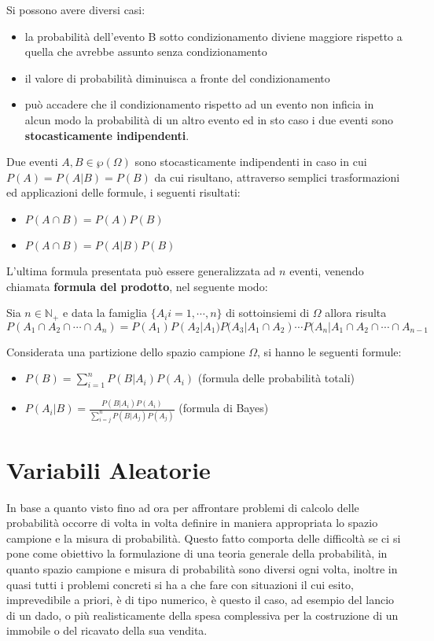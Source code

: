 \documentclass[a4paper,12pt, oneside]{book}
\newcommand{\numberset}{\mathbb}
\newcommand{\N}{\numberset{N}}
\begin{document}
Si possono avere diversi casi:
\begin{itemize}
    \item la probabilità dell’evento B sotto condizionamento diviene maggiore rispetto a quella 
          che avrebbe assunto senza condizionamento
    \item il valore di probabilità diminuisca a fronte del condizionamento
    \item può accadere che il condizionamento rispetto ad un evento non inficia in alcun modo la probabilità di 
        un altro evento ed in sto caso i due eventi sono \textbf{stocasticamente indipendenti}.
\end{itemize}
Due eventi $A, B \in \wp(\Omega)$ sono stocasticamente indipendenti in caso in cui $P(A) = P(A | B) = P(B)$
da cui risultano, attraverso semplici trasformazioni ed applicazioni delle formule, i seguenti risultati:
\begin{itemize}
    \item $P(A \cap B) = P(A) P(B)$
    \item $P(A \cap B) = P(A | B) P(B)$
\end{itemize}
L'ultima formula presentata può essere generalizzata ad $n$ eventi, venendo chiamata \textbf{formula del
prodotto}, nel seguente modo:
\begin{definizione}
    Sia $n \in \N _+$ e data la famiglia $\{A_i i=1, \cdots, n\}$ di sottoinsiemi di $\Omega$ allora risulta
    \[P(A_1 \cap A_2 \cap \cdots \cap A_n) = P(A_1) P(A_2 | A_1) P(A_3 | A_1 \cap A_2) \cdots 
                                             P(A_n | A_1 \cap A_2 \cap \cdots \cap A_{n-1} \]
\end{definizione}
Considerata una partizione dello spazio campione $\Omega$, si hanno le seguenti formule:
\begin{itemize}
    \item $P(B) = \sum_{i = 1} ^ n P(B | A_i) P(A_i)$ (formula delle probabilità totali)
    \item $P(A_i | B) = \frac{P(B | A_i) P(A_i)}{\sum_{i = j} ^ n P(B | A_j) P(A_j)}$ (formula di Bayes)
\end{itemize}

\section{Variabili Aleatorie}
In base a quanto visto fino ad ora per affrontare problemi di calcolo delle probabilità occorre di volta
in volta definire in maniera appropriata lo spazio campione e la misura di probabilità.\newline
Questo fatto comporta delle difficoltà se ci si pone come obiettivo la formulazione di una teoria
generale della probabilità, in quanto spazio campione e misura di probabilità sono diversi ogni volta,
inoltre in quasi tutti i problemi concreti si ha a che fare con situazioni il cui esito, imprevedibile a
priori, è di tipo numerico, è questo il caso, ad esempio del lancio di un dado, o più realisticamente
della spesa complessiva per la costruzione di un immobile o del ricavato della sua vendita.
\end{document}

